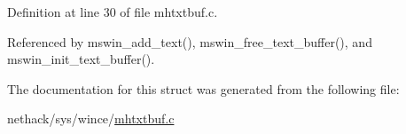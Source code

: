 Definition at line 30 of file mhtxtbuf.\+c.



Referenced by mswin\+\_\+add\+\_\+text(), mswin\+\_\+free\+\_\+text\+\_\+buffer(), and mswin\+\_\+init\+\_\+text\+\_\+buffer().



The documentation for this struct was generated from the following file\+:\begin{DoxyCompactItemize}
\item 
nethack/sys/wince/\hyperlink{mhtxtbuf_8c}{mhtxtbuf.\+c}\end{DoxyCompactItemize}
